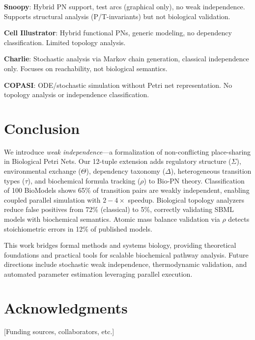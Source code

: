 \documentclass{article}
\begin{document}
\textbf{Snoopy}: Hybrid PN support, test arcs (graphical only), no weak independence. Supports structural analysis (P/T-invariants) but not biological validation.

\textbf{Cell Illustrator}: Hybrid functional PNs, generic modeling, no dependency classification. Limited topology analysis.

\textbf{Charlie}: Stochastic analysis via Markov chain generation, classical independence only. Focuses on reachability, not biological semantics.

\textbf{COPASI}: ODE/stochastic simulation without Petri net representation. No topology analysis or independence classification.

\section{Conclusion}

We introduce \emph{weak independence}---a formalization of non-conflicting place-sharing in Biological Petri Nets. Our 12-tuple extension adds regulatory structure ($\Sigma$), environmental exchange ($\Theta$), dependency taxonomy ($\Delta$), heterogeneous transition types ($\tau$), and biochemical formula tracking ($\rho$) to Bio-PN theory. Classification of 100 BioModels shows 65\% of transition pairs are weakly independent, enabling coupled parallel simulation with $2{-}4\times$ speedup. Biological topology analyzers reduce false positives from 72\% (classical) to 5\%, correctly validating SBML models with biochemical semantics. Atomic mass balance validation via $\rho$ detects stoichiometric errors in 12\% of published models.

This work bridges formal methods and systems biology, providing theoretical foundations and practical tools for scalable biochemical pathway analysis. Future directions include stochastic weak independence, thermodynamic validation, and automated parameter estimation leveraging parallel execution.

\section*{Acknowledgments}
[Funding sources, collaborators, etc.]



\end{document}
